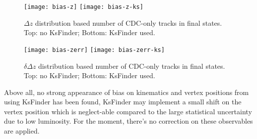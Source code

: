 \begin{figure}[htpb]
	\centering
	\texttt{[image: bias-z]}
	\texttt{[image: bias-z-ks]}
	\caption{$\Delta z$ distribution based number of CDC-only tracks in final states. Top: no KsFinder; Bottom: KsFinder used.}
	\label{fig:bias-z}
\end{figure}
\begin{figure}[htpb]
	\centering
	\texttt{[image: bias-zerr]}
	\texttt{[image: bias-zerr-ks]}
	\caption{$\delta\Delta z$ distribution based number of CDC-only tracks in final states. Top: no KsFinder; Bottom: KsFinder used.}
	\label{fig:bias-zerr}
\end{figure}
Above all, no strong appearance of bias on kinematics and vertex positions from using KsFinder has been found, KsFinder may implement a small shift on the vertex position which is neglect-able  compared to the large statistical uncertainty due to low luminosity. For the moment, there's no correction on these observables are applied.
